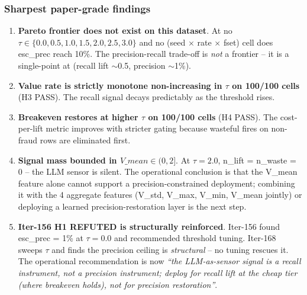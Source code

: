 \documentclass{article}
\begin{document}
\subsubsection{Sharpest paper-grade findings}
\begin{enumerate}
\item \textbf{Pareto frontier does not exist on this dataset}. At no
$\tau \in \{0.0, 0.5, 1.0, 1.5, 2.0, 2.5, 3.0\}$ and no (seed $\times$
rate $\times$ fset) cell does esc\_prec reach 10\%. The
precision-recall trade-off is \emph{not} a frontier -- it is a
single-point at (recall lift $\sim$0.5, precision $\sim$1\%).
\item \textbf{Value rate is strictly monotone non-increasing in $\tau$
on 100/100 cells} (H3 PASS). The recall signal decays predictably as
the threshold rises.
\item \textbf{Breakeven restores at higher $\tau$ on 100/100 cells}
(H4 PASS). The cost-per-lift metric improves with stricter gating
because wasteful fires on non-fraud rows are eliminated first.
\item \textbf{Signal mass bounded in $V\_mean \in (0, 2]$}. At
$\tau = 2.0$, n\_lift = n\_waste = 0 -- the LLM sensor is silent. The
operational conclusion is that the V\_mean feature alone cannot
support a precision-constrained deployment; combining it with the 4
aggregate features (V\_std, V\_max, V\_min, V\_mean jointly) or
deploying a learned precision-restoration layer is the next step.
\item \textbf{Iter-156 H1 REFUTED is structurally reinforced}.
Iter-156 found esc\_prec = 1\% at $\tau = 0.0$ and recommended
threshold tuning. Iter-168 sweeps $\tau$ and finds the precision
ceiling is \emph{structural} -- no tuning rescues it. The
operational recommendation is now \emph{``the LLM-as-sensor signal
is a recall instrument, not a precision instrument; deploy for
recall lift at the cheap tier (where breakeven holds), not for
precision restoration''}.
\end{enumerate}
\end{document}
